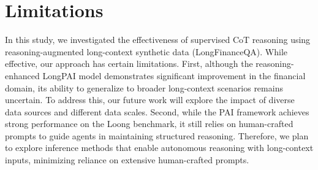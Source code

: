 \section*{Limitations}
In this study, we investigated the effectiveness of supervised CoT reasoning using reasoning-augmented long-context synthetic data (LongFinanceQA). While effective, our approach has certain limitations.
First, although the reasoning-enhanced LongPAI model demonstrates significant improvement in the financial domain, its ability to generalize to broader long-context scenarios remains uncertain. To address this, our future work will explore the impact of diverse data sources and different data scales.
Second, while the PAI framework achieves strong performance on the Loong benchmark, it still relies on human-crafted prompts to guide agents in maintaining structured reasoning. Therefore, we plan to explore inference methods that enable autonomous reasoning with long-context inputs, minimizing reliance on extensive human-crafted prompts.